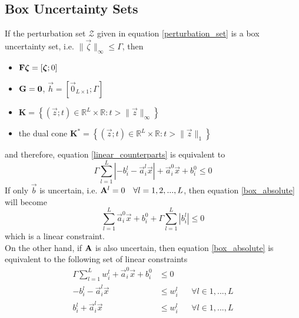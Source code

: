 \subsection{Box Uncertainty Sets} \label{box_linear_app}
If the perturbation set $\mathcal{Z}$ given in equation \eqref{perturbation_set} is a box uncertainty set, i.e. $\|\vec{\zeta}\|_{\infty} \leq \Gamma$, then 
\begin{itemize}
	\item $\mathbf{F}\bm{\zeta} = [\bm{\zeta};0]$ 
	\item $\mathbf{G} = \mathbf{0}$, $\vec{h} = [\vec{0}_{L \times 1};\Gamma]$
	\item $\mathbf{K} = \left\{(\vec{z};t) \in \mathbb{R}^L \times \mathbb{R}: t > \|\vec{z}\|_{\infty} \right\}$ 
	\item the dual cone $\mathbf{K}^* = \left\{(\vec{z};t) \in \mathbb{R}^L \times \mathbb{R}: t > \|\vec{z}\|_{1} \right\}$
\end{itemize}
and therefore, equation \eqref{linear_counterparts} is equivalent to
\begin{equation}
\Gamma \textstyle{\sum}_{l=1}^L |- {b}^l_{i} - \vec{a}^l_i\vec{x}| + \vec{a}^0_i\vec{x} + b^0_i \leq 0
\label{box_absolute}
\end{equation}
If only $\vec{b}$ is uncertain, i.e. $\mathbf{A}^l = 0 \quad \forall l = 1,2,...,L$, then equation \eqref{box_absolute} will become
\begin{equation}
\textstyle{\sum}_{l=1}^L \vec{a}^0_{i}\vec{x} + b^0_{i} + \Gamma \textstyle{\sum}_{l=1}^L |b^l_{i}| \leq 0
\label{box_coeff}
\end{equation}
which is a linear constraint.\\
On the other hand, if $\mathbf{A}$ is also uncertain, then equation \eqref{box_absolute} is equivalent to the following set of linear constraints
\begin{equation}
\begin{aligned}
\Gamma \textstyle{\sum}_{l=1}^L w^l_{i} + \vec{a}^0_{i}\vec{x} + b^0_{i} &\leq 0\\
- b^l_{i} - \vec{a}^l_{i}\vec{x} &\leq w^l_{i} &&\forall l \in 1,...,L\\
b^l_{i} + \vec{a}^l_{i}\vec{x} &\leq w^l_{i} &&\forall l \in 1,...,L\\
\end{aligned}
\label{box_linear}
\end{equation}

